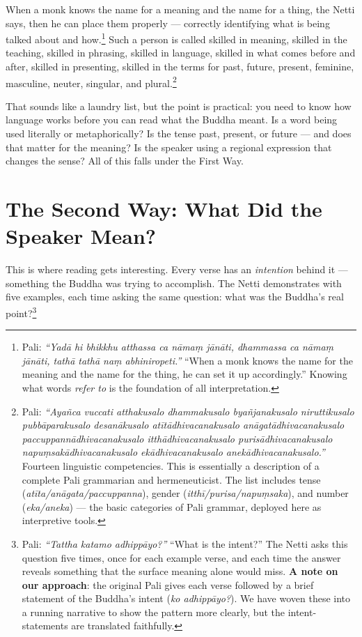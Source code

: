 When a monk knows the name for a meaning and the name for a thing, the Netti says, then he can place them properly --- correctly identifying what is being talked about and how.\footnote{Pali: \textit{``Yadā hi bhikkhu atthassa ca nāmaṃ jānāti, dhammassa ca nāmaṃ jānāti, tathā tathā naṃ abhiniropeti.''} ``When a monk knows the name for the meaning and the name for the thing, he can set it up accordingly.'' Knowing what words \textit{refer to} is the foundation of all interpretation.} Such a person is called skilled in meaning, skilled in the teaching, skilled in phrasing, skilled in language, skilled in what comes before and after, skilled in presenting, skilled in the terms for past, future, present, feminine, masculine, neuter, singular, and plural.\footnote{Pali: \textit{``Ayañca vuccati atthakusalo dhammakusalo byañjanakusalo niruttikusalo pubbāparakusalo desanākusalo atītādhivacanakusalo anāgatādhivacanakusalo paccuppannādhivacanakusalo itthādhivacanakusalo purisādhivacanakusalo napuṃsakādhivacanakusalo ekādhivacanakusalo anekādhivacanakusalo.''} Fourteen linguistic competencies. This is essentially a description of a complete Pali grammarian and hermeneuticist. The list includes tense (\textit{atīta/anāgata/paccuppanna}), gender (\textit{itthī/purisa/napuṃsaka}), and number (\textit{eka/aneka}) --- the basic categories of Pali grammar, deployed here as interpretive tools.}

That sounds like a laundry list, but the point is practical: you need to know how language works before you can read what the Buddha meant. Is a word being used literally or metaphorically? Is the tense past, present, or future --- and does that matter for the meaning? Is the speaker using a regional expression that changes the sense? All of this falls under the First Way.

\section*{The Second Way: What Did the Speaker Mean?}

This is where reading gets interesting. Every verse has an \textit{intention} behind it --- something the Buddha was trying to accomplish. The Netti demonstrates with five examples, each time asking the same question: what was the Buddha's real point?\footnote{Pali: \textit{``Tattha katamo adhippāyo?''} ``What is the intent?'' The Netti asks this question five times, once for each example verse, and each time the answer reveals something that the surface meaning alone would miss. \textbf{A note on our approach}: the original Pali gives each verse followed by a brief statement of the Buddha's intent (\textit{ko adhippāyo?}). We have woven these into a running narrative to show the pattern more clearly, but the intent-statements are translated faithfully.}


